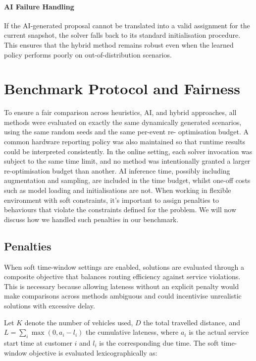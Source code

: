 \paragraph{AI Failure Handling}
If the AI-generated proposal cannot be translated into a valid assignment for
the current snapshot, the solver falls back to its standard initialisation
procedure. This ensures that the hybrid method remains robust even when the
learned policy performs poorly on out-of-distribution scenarios.


\section{Benchmark Protocol and Fairness}

To ensure a fair comparison across heuristics, AI, and hybrid approaches, all
methods were evaluated on exactly the same dynamically generated scenarios,
using the same random seeds and the same per-event re- optimisation budget. A
common hardware reporting policy was also maintained so that runtime results
could be interpreted consistently. In the online setting, each solver invocation
was subject to the same time limit, and no method was intentionally granted a
larger re-optimisation budget than another. AI inference time, possibly
including augmentation and sampling, are included in the time budget, whilst
one-off costs such as model loading and initialisations are not. When working in
flexible environment with soft constraints, it's important to assign penalties
to behaviours that violate the constraints defined for the problem. We will now
discuss how we handled such penalties in our benchmark.

\subsection{Penalties}

When soft time-window settings are enabled, solutions are evaluated through a
composite objective that balances routing efficiency against service violations.
This is necessary because allowing lateness without an explicit penalty would
make comparisons across methods ambiguous and could incentivise unrealistic
solutions with excessive delay.

Let $K$ denote the number of vehicles used, $D$ the total travelled distance,
and $L=\sum_i \max(0,a_i-l_i)$ the cumulative lateness, where $a_i$ is the
actual service start time at customer $i$ and $l_i$ is the corresponding due
time. The soft time-window objective is evaluated lexicographically as:

